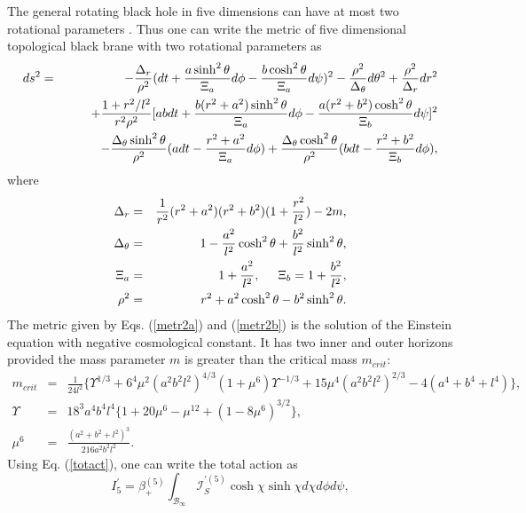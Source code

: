 \documentclass[a4paper,12pt,onecolumn]{revtex4}
\begin{document}
The general rotating black hole in five dimensions can have at
most two rotational parameters \cite{Hawk}. Thus one can write the
metric of five dimensional topological black brane with two
rotational parameters as
\begin{eqnarray}
ds^2 &=&-\frac{\Delta _r}{\rho ^2}(dt+\frac{a\sinh ^2\theta }{\Xi _a}d\phi -%
\frac{b\cosh ^2\theta }{\Xi _a}d\psi )^2-\frac{\rho ^2}{\Delta _\theta }%
d\theta ^2+\frac{\rho ^2}{\Delta _r}dr^2  \nonumber \\
&&\ \ \ \ \ \ +\frac{1+r^2/l^2}{r^2\rho ^2}[a b
dt+\frac{b(r^2+a^2)\sinh ^2\theta }{\Xi _a}d\phi
-\frac{a(r^2+b^2)\cosh ^2\theta }{\Xi _b}d\psi ]^2
\nonumber \\
&&\ \ \ \ \ \ -\frac{\Delta _\theta \sinh ^2\theta }{\rho ^2}(a dt-\frac{%
r^2+a^2}{\Xi _a}d\phi )+\frac{\Delta _\theta \cosh ^2\theta }{\rho ^2}(b dt-%
\frac{r^2+b^2}{\Xi _b}d\phi ),  \label{metr2a}
\end{eqnarray}
where
\begin{eqnarray}
\Delta _r &=&\frac 1{r^2}(r^2+a^2)(r^2+b^2)(1+\frac{r^2}{l^2})-2m,  \nonumber
\\
\Delta _\theta  &=&1-\frac{a^2}{l^2}\cosh ^2\theta +\frac{b^2}{l^2}\sinh
^2\theta ,  \nonumber \\
\Xi _a &=&1+\frac{a^2}{l^2},\hspace{.5cm}\Xi _b=1+\frac{b^2}{l^2},  \nonumber
\\
\rho ^2 &=&r^2+a^2\cosh ^2\theta -b^2\sinh ^2\theta .  \label{metr2b}
\end{eqnarray}
The metric given by Eqs. (\ref{metr2a}) and (\ref{metr2b}) is the
solution of the Einstein equation with negative cosmological
constant. It has two inner and outer
horizons provided the mass parameter $m$ is greater than the critical mass $%
m_{crit}$:
\begin{eqnarray}
m_{crit} &=&\frac 1{24l^2}\{\Upsilon ^{1/3}+6^4\mu ^2(a^2b^2l^2)^{4/3}(1+\mu
^6)\Upsilon ^{-1/3}+15\mu ^4(a^2b^2l^2)^{2/3}-4(a^4+b^4+l^4)\} ,  \nonumber \\
\Upsilon  &=&18^3a^4b^4l^4\{1+20\mu ^6-\mu ^{12}+(1-8\mu
^6)^{3/2}\} , \nonumber \\
\mu^6&=&\frac{(a^2+b^2+l^2)^3}{216a^2b^2l^2}. \label{Mcr5b}
\end{eqnarray}
Using Eq. (\ref{totact}), one can write the total action as
\begin{equation}
I_5^{\prime }=\beta _{+}^{(5)}\int_{\mathcal{B}_\infty }\mathcal{I}%
_S^{\prime (5)}\cosh \chi \sinh \chi d\chi d\phi d\psi ,  \label{Act5b}
\end{equation}
\end{document}
